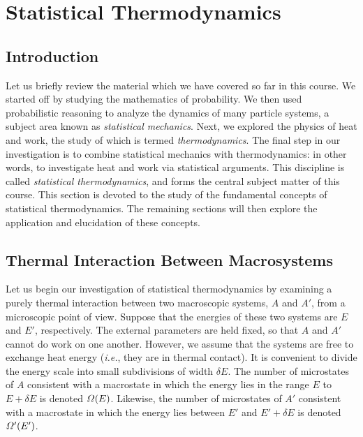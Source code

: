 \chapter{Statistical Thermodynamics}\label{s5}

\section{Introduction}
Let us briefly
review  the material which we have covered so far in this  course.
We started off 
by studying the mathematics of probability. We then used probabilistic
reasoning to analyze the dynamics of many particle systems, a subject area 
known as {\em statistical mechanics}. Next, we explored the physics of heat and
work, the study of which is termed {\em thermodynamics}. The final step in our 
investigation is to
combine statistical mechanics with thermodynamics: in other words, to
investigate heat and work  via statistical arguments. This discipline is
called {\em statistical thermodynamics}, and forms the central subject matter
of this course.
This section is devoted to the study of the fundamental concepts
of statistical thermodynamics. The remaining sections will  then
explore the application and elucidation of these concepts.

\section{Thermal Interaction Between Macrosystems}\label{s5.2}
Let us begin our investigation of statistical thermodynamics
 by examining
 a purely thermal interaction between two macroscopic
systems, $A$ and $A'$, from a microscopic point of view. Suppose that the energies of
these  two systems are $E$ and $E'$, respectively. The external parameters are held 
fixed, so that $A$ and $A'$  cannot  do work on one another. However, we 
assume that
the systems are   free to exchange heat energy ({\em i.e.}, they are in thermal contact).
It is convenient to divide the energy
scale into small subdivisions of width $\delta E$. 
The number of microstates of $A$ consistent with a 
macrostate in which the energy lies in the range $E$ to $E+\delta E$ is denoted
${\mit\Omega}(E)$. Likewise, the number of microstates of $A'$ consistent with a
macrostate in which the energy lies between $E'$  and $E'+\delta E$ is
denoted ${\mit\Omega}'(E')$.

